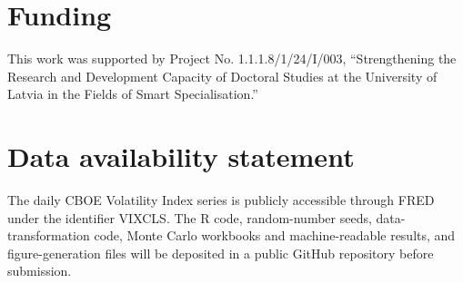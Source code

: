 \documentclass[12pt]{article}
\theoremstyle{remark}
\begin{document}
\section*{Funding}
This work was supported by Project No. 1.1.1.8/1/24/I/003, ``Strengthening the Research and Development Capacity of Doctoral Studies at the University of Latvia in the Fields of Smart Specialisation.''

\section*{Data availability statement}
The daily CBOE Volatility Index series is publicly accessible through FRED under the identifier VIXCLS. The R code, random-number seeds, data-transformation code, Monte Carlo workbooks and machine-readable results, and figure-generation files will be deposited in a public GitHub repository before submission.
\end{document}
